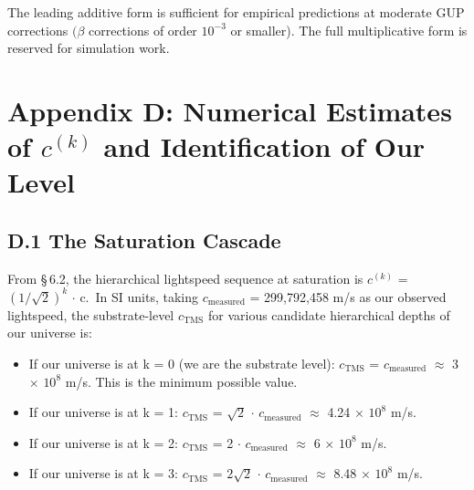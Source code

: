 \documentclass[11pt,oneside]{report}
\theoremstyle{definition}
\theoremstyle{remark}
\begin{document}
The leading additive form is sufficient for empirical predictions at
moderate GUP corrections \ensuremath{(\beta} corrections of order \ensuremath{10^{-3}} or smaller). The
full multiplicative form is reserved for simulation work.

\section*{Appendix D: Numerical Estimates of \ensuremath{c^{(k)}} and Identification of Our Level}

\subsection*{D.1 The Saturation Cascade}

From \S\,6.2, the hierarchical lightspeed sequence at saturation is
\ensuremath{c^{(k)}} = \ensuremath{(1/\sqrt{2})^{k}} \ensuremath{\cdot} c.~In SI units, taking \ensuremath{c_{\mathrm{measured}}} =
299,792,458 m/s as our observed lightspeed, the substrate-level \ensuremath{c_{\mathrm{TMS}}}
for various candidate hierarchical depths of our universe is:

\begin{itemize}
\item
  If our universe is at k = 0 (we are the substrate level): \ensuremath{c_{\mathrm{TMS}}} =
  \ensuremath{c_{\mathrm{measured}}} \ensuremath{\approx} 3 \ensuremath{\times} \ensuremath{10^{8}} m/s. This is the minimum possible value.
\end{itemize}

\begin{itemize}
\item
  If our universe is at k = 1: \ensuremath{c_{\mathrm{TMS}}} = \ensuremath{\sqrt{2}} \ensuremath{\cdot} \ensuremath{c_{\mathrm{measured}}} \ensuremath{\approx} 4.24 \ensuremath{\times} \ensuremath{10^{8}}
  m/s.
\end{itemize}

\begin{itemize}
\item
  If our universe is at k = 2: \ensuremath{c_{\mathrm{TMS}}} = 2 \ensuremath{\cdot} \ensuremath{c_{\mathrm{measured}}} \ensuremath{\approx} 6 \ensuremath{\times} \ensuremath{10^{8}} m/s.
\end{itemize}

\begin{itemize}
\item
  If our universe is at k = 3: \ensuremath{c_{\mathrm{TMS}}} = \ensuremath{2\sqrt{2}} \ensuremath{\cdot} \ensuremath{c_{\mathrm{measured}}} \ensuremath{\approx} 8.48 \ensuremath{\times} \ensuremath{10^{8}}
  m/s.
\end{itemize}
\end{document}
